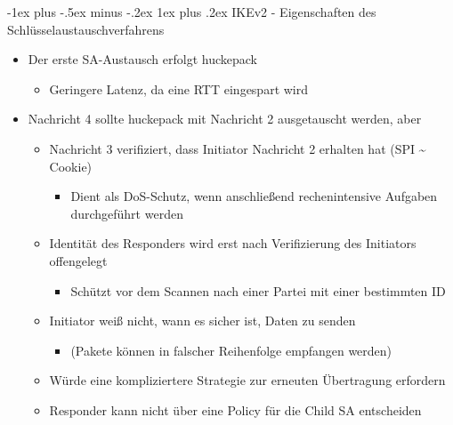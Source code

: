 \documentclass[a4paper]{article}
\makeatletter
\renewcommand{\subsubsection}{\@startsection{subsubsection}{3}{0mm}%
 {-1ex plus -.5ex minus -.2ex}%
 {1ex plus .2ex}%
 {\normalfont\small\bfseries}}
\makeatother
\begin{document}
\begin{multicols}{3}
    \subsubsection{IKEv2 - Eigenschaften des
        Schlüsselaustauschverfahrens}

    \begin{itemize}
        \item
              Der erste SA-Austausch erfolgt huckepack

              \begin{itemize}
                  \item
                        Geringere Latenz, da eine RTT eingespart wird
              \end{itemize}
        \item
              Nachricht 4 sollte huckepack mit Nachricht 2 ausgetauscht werden, aber

              \begin{itemize}
                  \item
                        Nachricht 3 verifiziert, dass Initiator Nachricht 2 erhalten hat
                        (SPI \textasciitilde{} Cookie)

                        \begin{itemize}
                            \item
                                  Dient als DoS-Schutz, wenn anschließend rechenintensive Aufgaben
                                  durchgeführt werden
                        \end{itemize}
                  \item
                        Identität des Responders wird erst nach Verifizierung des Initiators
                        offengelegt

                        \begin{itemize}
                            \item
                                  Schützt vor dem Scannen nach einer Partei mit einer bestimmten ID
                        \end{itemize}
                  \item
                        Initiator weiß nicht, wann es sicher ist, Daten zu senden

                        \begin{itemize}
                            \item
                                  (Pakete können in falscher Reihenfolge empfangen werden)
                        \end{itemize}
                  \item
                        Würde eine kompliziertere Strategie zur erneuten Übertragung
                        erfordern
                  \item
                        Responder kann nicht über eine Policy für die Child SA entscheiden
              \end{itemize}
    \end{itemize}



\end{multicols}
\end{document}
